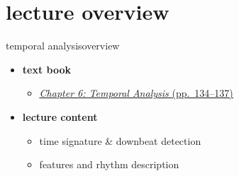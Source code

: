 

\subtitle{Part 7.2: Temporal Analysis}


	

    \section[overview]{lecture overview}
        \begin{frame}{temporal analysis}{overview}
            \begin{itemize}
                \item   \textbf{text book}  
                    \begin{itemize}
                        \item   \href{http://ieeexplore.ieee.org/xpl/articleDetails.jsp?tp=&arnumber=6331123&}{\underline{\textit{Chapter 6: Temporal Analysis} (pp.~134--137)}}
                    \end{itemize}
                \bigskip
                \item<2->   \textbf{lecture content}
                    \begin{itemize}
                        \item<2->   time signature \& downbeat detection
                        \item<3->   features and rhythm description
                    \end{itemize}
            \end{itemize}
        \end{frame}


